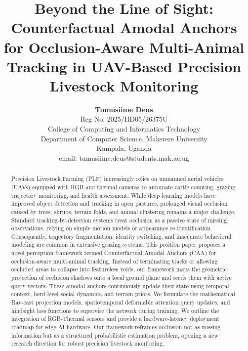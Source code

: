 \documentclass[10pt,conference,letterpaper,twocolumn]{article}
\begin{document}
\title{\textbf{\Large Beyond the Line of Sight: Counterfactual Amodal Anchors for Occlusion-Aware Multi-Animal Tracking in UAV-Based Precision Livestock Monitoring}}

\author{\textbf{Tumusiime Deus} \\
Reg No: 2025/HD05/26375U \\
College of Computing and Informatics Technology \\
Department of Computer Science, Makerere University \\
Kampala, Uganda \\
email: tumusiime.deus@students.mak.ac.ug}

\date{}
\maketitle

\thispagestyle{empty}
\pagestyle{empty}

\begin{abstract}
Precision Livestock Farming (PLF) increasingly relies on unmanned aerial vehicles (UAVs) equipped with RGB and thermal cameras to automate cattle counting, grazing trajectory monitoring, and health assessment. While deep learning models have improved object detection and tracking in open pastures, prolonged visual occlusion caused by trees, shrubs, terrain folds, and animal clustering remains a major challenge. Standard tracking-by-detection systems treat occlusion as a passive state of missing observations, relying on simple motion models or appearance re-identification. Consequently, trajectory fragmentation, identity switching, and inaccurate behavioral modeling are common in extensive grazing systems. This position paper proposes a novel perception framework termed Counterfactual Amodal Anchors (CAA) for occlusion-aware multi-animal tracking. Instead of terminating tracks or allowing occluded areas to collapse into featureless voids, our framework maps the geometric projection of occlusion shadows onto a local ground plane and seeds them with active query vectors. These amodal anchors continuously update their state using temporal context, herd-level social dynamics, and terrain priors. We formulate the mathematical Ray-cast projection models, spatiotemporal deformable attention query updates, and hindsight loss functions to supervise the network during training. We outline the integration of RGB-Thermal sensors and provide a hardware-latency deployment roadmap for edge AI hardware. Our framework reframes occlusion not as missing information but as a structured probabilistic estimation problem, opening a new research direction for robust precision livestock monitoring.
\end{abstract}
\end{document}
